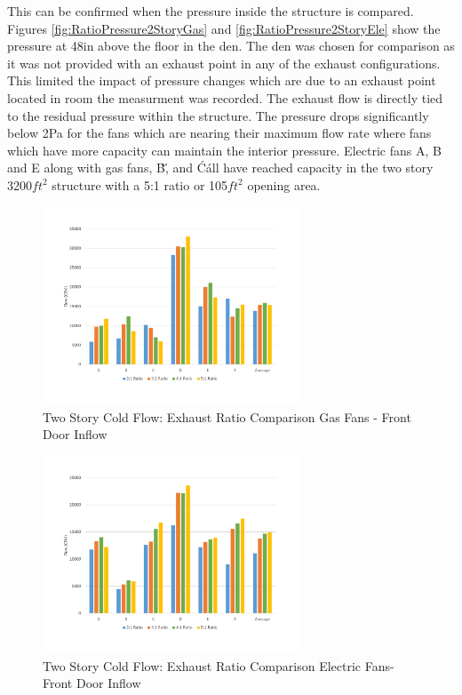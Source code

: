 \documentclass{article}
\begin{document}
This can be confirmed when the pressure inside the structure is compared. Figures \ref{fig:RatioPressure2StoryGas} and \ref{fig:RatioPressure2StoryEle} show the pressure at 48in above the floor in the den. The den was chosen for comparison as it was not provided with an exhaust point in any of the exhaust configurations. This limited the impact of pressure changes which are due to an exhaust point located in room the measurment was recorded. The exhaust flow is directly tied to the residual pressure within the structure. The pressure drops significantly below 2Pa for the fans which are nearing their maximum flow rate where fans which have more capacity can maintain the interior pressure. Electric fans A, B and E along with gas fans, \'B\', and \'C\' all have reached capacity in the two story 3200$ft^2$ structure with a 5:1 ratio or 105$ft^2$ opening area. 

\begin{figure}[H]
	\centering
	\includegraphics[width=3in]{0_Images/ColdFlow/Two_Story/RatioFlowDoorGas.pdf}
	\caption{Two Story Cold Flow: Exhaust Ratio Comparison Gas Fans - Front Door Inflow}
	\label{fig:RatioInflow2StoryGas}
\end{figure}

\begin{figure}[H]
	\centering
	\includegraphics[width=3in]{0_Images/ColdFlow/Two_Story/RatioFlowDoorEle.pdf}
	\caption{Two Story Cold Flow: Exhaust Ratio Comparison Electric Fans- Front Door Inflow}
	\label{fig:RatioInflow2StoryEle}
\end{figure}
\end{document}
